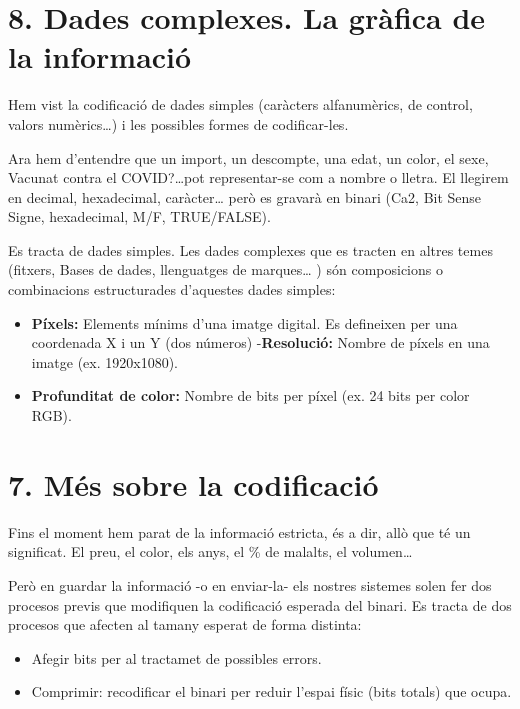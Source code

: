 \documentclass[
  12 pt,
  a4paper,
]{article}
\providecommand{\tightlist}{%
  \setlength{\itemsep}{0pt}\setlength{\parskip}{0pt}}
\begin{document}
\section{8. Dades complexes. La gràfica de la
informació}\label{dades-complexes.-la-gruxe0fica-de-la-informaciuxf3}

Hem vist la codificació de dades simples (caràcters alfanumèrics, de
control, valors numèrics\ldots) i les possibles formes de codificar-les.

Ara hem d'entendre que un import, un descompte, una edat, un color, el
sexe, Vacunat contra el COVID?\ldots pot representar-se com a nombre o
lletra. El llegirem en decimal, hexadecimal, caràcter\ldots{} però es
gravarà en binari (Ca2, Bit Sense Signe, hexadecimal, M/F, TRUE/FALSE).

Es tracta de dades simples. Les dades complexes que es tracten en altres
temes (fitxers, Bases de dades, llenguatges de marques\ldots{} ) són
composicions o combinacions estructurades d'aquestes dades simples:

\begin{itemize}
\tightlist
\item
  \textbf{Píxels:} Elements mínims d'una imatge digital. Es defineixen
  per una coordenada X i un Y (dos números) -\textbf{Resolució:} Nombre
  de píxels en una imatge (ex. 1920x1080).
\item
  \textbf{Profunditat de color:} Nombre de bits per píxel (ex. 24 bits
  per color RGB).
\end{itemize}

\section{7. Més sobre la
codificació}\label{muxe9s-sobre-la-codificaciuxf3}

Fins el moment hem parat de la informació estricta, és a dir, allò que
té un significat. El preu, el color, els anys, el \% de malalts, el
volumen\ldots{}

Però en guardar la informació -o en enviar-la- els nostres sistemes
solen fer dos procesos previs que modifiquen la codificació esperada del
binari. Es tracta de dos procesos que afecten al tamany esperat de forma
distinta:

\begin{itemize}
\item
  Afegir bits per al tractamet de possibles errors.
\item
  Comprimir: recodificar el binari per reduir l'espai físic (bits
  totals) que ocupa.
\end{itemize}
\end{document}
